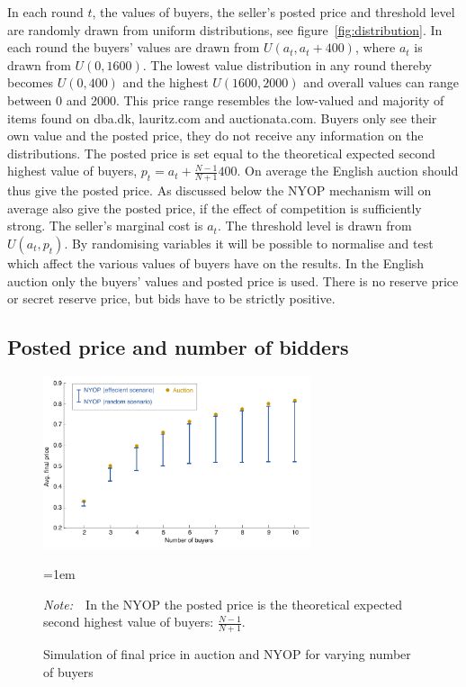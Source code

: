 \documentclass[a4paper,12pt]{article}
\newcommand{\Figtext}[1]{%
	\begin{tablenotes}[para,flushleft]
		\hangindent=1em
		\footnotesize
		\raggedright
		#1
	\end{tablenotes}
}
\newcommand{\Fignote}[1]{\Figtext{\emph{Note:~}~#1}}
\begin{document}
	In each round $t$, the values of buyers, the seller's posted price and threshold level are randomly drawn from uniform distributions, see figure~\ref{fig:distribution}. In each round the buyers' values are drawn from $U(a_t , a_t + 400)$, where $a_t$ is drawn from $U(0, 1600)$. The lowest value distribution in any round thereby becomes $U(0, 400)$ and the highest $U(1600, 2000)$ and overall values can range between 0 and 2000. This price range resembles the low-valued and majority of items found on dba.dk, lauritz.com and auctionata.com. Buyers only see their own value and the posted price, they do not receive any information on the distributions. The posted price is set equal to the theoretical expected second highest value of buyers, $p_t = a_t + \frac{N-1}{N+1}400$. On average the English auction should thus give the posted price. As discussed below the NYOP mechanism will on average also give the posted price, if the effect of competition is sufficiently strong. The seller's marginal cost is $a_t$. The threshold level is drawn from $U(a_t, p_t)$. By randomising variables it will be possible to normalise and test which affect the various values of buyers have on the results. In the English auction only the buyers' values and posted price is used. There is no reserve price or secret reserve price, but bids have to be strictly positive.
	
	\subsection{Posted price and number of bidders}

	\begin{figure}
	        \centering
	        \caption{Simulation of final price in auction and NYOP for varying number of buyers}
	        \includegraphics[width=0.7\textwidth]{Figures/FinalPrice_Auction-NYOP}
			\label{fig:FinalPrice_Auction-NYOP}
			\Fignote{In the NYOP the posted price is the theoretical expected second highest value of buyers: $\frac{N-1}{N+1}$.}
	\end{figure}
	
\end{document}
